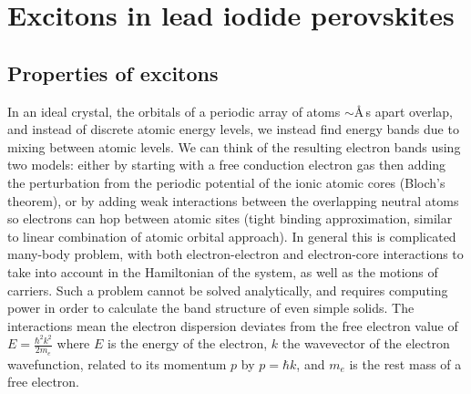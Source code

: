 
\chapter{Excitons in lead iodide perovskites}

\graphicspath{{Chapter2/Figures/}}

\section{Properties of excitons}
In an ideal crystal, the orbitals of a periodic array of atoms $\sim$\AA\,s apart overlap, and instead of discrete atomic energy levels, we instead find energy bands due to mixing between atomic levels. We can think of the resulting electron bands using two models: either by starting with a free conduction electron gas then adding the perturbation from the periodic potential of the ionic atomic cores (Bloch's theorem), or by adding weak interactions between the overlapping neutral atoms so electrons can hop between atomic sites (tight binding approximation, similar to linear combination of atomic orbital approach). In general this is complicated many-body problem, with both electron-electron and electron-core interactions to take into account in the Hamiltonian of the system, as well as the motions of carriers. Such a problem cannot be solved analytically, and requires computing power in order to calculate the band structure of even simple solids. The interactions mean the electron dispersion deviates from the free electron value of $E=\frac{\hbar^2k^2}{2m_e}$ where $E$ is the energy of the electron, $k$ the wavevector of the electron wavefunction, related to its momentum $p$ by $p=\hbar k$, and $m_e$ is the rest mass of a free electron.

